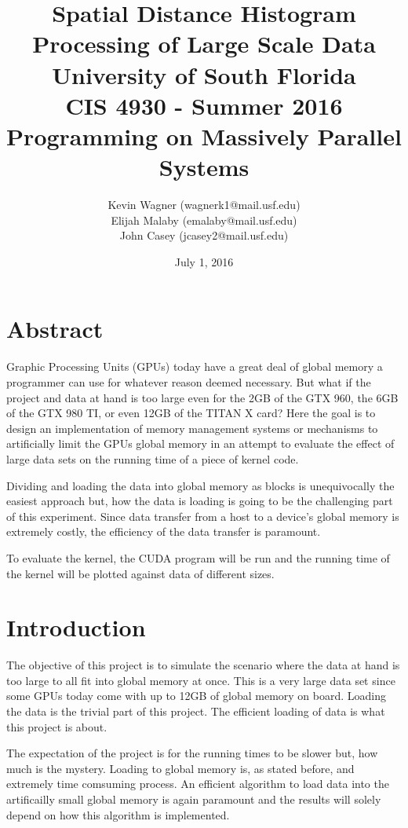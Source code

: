 \documentclass[twocolumn]{article}
\title{\textbf{Spatial Distance Histogram Processing
	   of Large Scale Data} \\
	   University of South Florida\\
	   CIS 4930 - Summer 2016\\
	   Programming on Massively Parallel Systems}
\author{Kevin Wagner (wagnerk1@mail.usf.edu)\\
		Elijah Malaby (emalaby@mail.usf.edu)\\
		John Casey (jcasey2@mail.usf.edu)}
\date{July 1, 2016}
\begin{document}
	\maketitle
	\newpage
	\tableofcontents
	
	\newpage
  
\section{Abstract}
\par Graphic Processing Units (GPUs) today have a great deal of global memory a programmer can use for whatever reason deemed necessary. But what if the project and data at hand is too large even for the 2GB of the GTX 960, the 6GB of the GTX 980 TI, or even 12GB of the TITAN X card? Here the goal is to design an implementation of memory management systems or mechanisms to artificially limit the GPUs  global memory in an attempt to evaluate the effect of large data sets on the running time of a piece of kernel code.
\par Dividing and loading the data into global memory as blocks is unequivocally the easiest approach but, how the data is loading is going to be the challenging part of this experiment. Since data transfer from a host to a device's global memory is extremely costly, the efficiency of the data transfer is paramount.
\par{}To evaluate the kernel, the CUDA program will be run and the running time of the kernel will be plotted against data of different sizes.


\section{Introduction}
\par The objective of this project is to simulate the scenario where the data at hand is too large to all fit into global memory at once. This is a very large data set since some GPUs today come with up to 12GB of global memory on board. Loading the data is the trivial part of this project. The efficient loading of data is what this project is about. 
\par The expectation of the project is for the running times to be slower but, how much is the mystery. Loading to global memory is, as stated before, and extremely time comsuming process. An efficient algorithm to load data into the artificailly small global memory is again paramount and the results will solely depend on how this algorithm is implemented.
 
\end{document}
